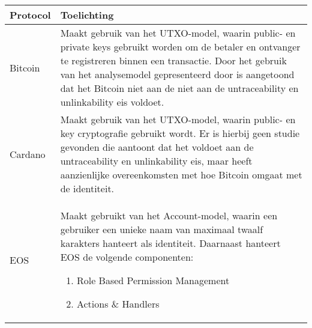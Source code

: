 \begin{tabular}{|p{5cm}|p{10cm}|}
  \hline
  \textbf{Protocol} & \textbf{Toelichting} \\
  \hline
  Bitcoin & Maakt gebruik van het UTXO-model, waarin public- en private keys gebruikt worden om de betaler en ontvanger te registreren binnen een transactie. Door het gebruik van het analysemodel gepresenteerd door \cite{reid2013analysis} is aangetoond dat het Bitcoin niet aan de niet aan de untraceability en unlinkability eis voldoet. \\
  \hline
  Cardano & Maakt gebruik van het UTXO-model, waarin public- en key cryptografie gebruikt wordt. Er is hierbij geen studie gevonden die aantoont dat het voldoet aan de untraceability en unlinkability eis, maar heeft aanzienlijke overeenkomsten met hoe Bitcoin omgaat met de identiteit. \\
  \hline
  EOS & Maakt gebruikt van het Account-model, waarin een gebruiker een unieke naam van maximaal twaalf karakters hanteert als identiteit. Daarnaast hanteert EOS de volgende componenten:
  \begin{enumerate}
    \item Role Based Permission Management
    \item Actions \& Handlers
  \end{enumerate}
  \\
  \hline
\end{tabular}